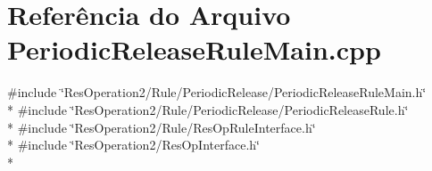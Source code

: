 \section{Referência do Arquivo Periodic\+Release\+Rule\+Main.\+cpp}
\label{_2_rule_2_periodic_release_2_periodic_release_rule_main_8cpp}
{\ttfamily \#include \char`\"{}Res\+Operation2/\+Rule/\+Periodic\+Release/\+Periodic\+Release\+Rule\+Main.\+h\char`\"{}}\\*
{\ttfamily \#include \char`\"{}Res\+Operation2/\+Rule/\+Periodic\+Release/\+Periodic\+Release\+Rule.\+h\char`\"{}}\\*
{\ttfamily \#include \char`\"{}Res\+Operation2/\+Rule/\+Res\+Op\+Rule\+Interface.\+h\char`\"{}}\\*
{\ttfamily \#include \char`\"{}Res\+Operation2/\+Res\+Op\+Interface.\+h\char`\"{}}\\*
